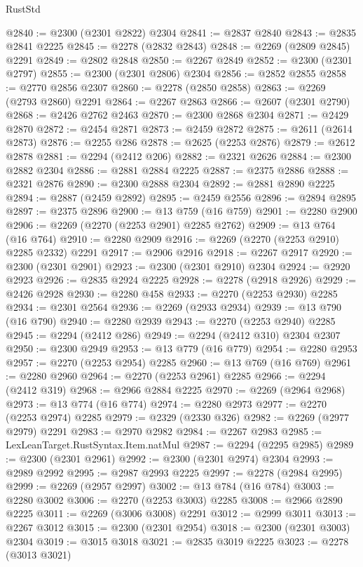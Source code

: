 \begin{lexlean}{RustStd}
\begin{coremodule}
@2840 := @2300 (@2301 @2822) @2304
@2841 := @2837 @2840
@2843 := @2835 @2841 @2225
@2845 := @2278 (@2832 @2843)
@2848 := @2269 (@2809 @2845) @2291
@2849 := @2802 @2848
@2850 := @2267 @2849
@2852 := @2300 (@2301 @2797)
@2855 := @2300 (@2301 @2806) @2304
@2856 := @2852 @2855
@2858 := @2770 @2856 @2307
@2860 := @2278 (@2850 @2858)
@2863 := @2269 (@2793 @2860) @2291
@2864 := @2267 @2863
@2866 := @2607 (@2301 @2790)
@2868 := @2426 @2762 @2463
@2870 := @2300 @2868 @2304
@2871 := @2429 @2870
@2872 := @2454 @2871
@2873 := @2459 @2872
@2875 := @2611 (@2614 @2873)
@2876 := @2255 @286
@2878 := @2625 (@2253 @2876)
@2879 := @2612 @2878
@2881 := @2294 (@2412 @206)
@2882 := @2321 @2626
@2884 := @2300 @2882 @2304
@2886 := @2881 @2884 @2225
@2887 := @2375 @2886
@2888 := @2321 @2876
@2890 := @2300 @2888 @2304
@2892 := @2881 @2890 @2225
@2894 := @2887 (@2459 @2892)
@2895 := @2459 @2556
@2896 := @2894 @2895
@2897 := @2375 @2896
@2900 := @13 @759 (@16 @759)
@2901 := @2280 @2900
@2906 := @2269 (@2270 (@2253 @2901) @2285 @2762)
@2909 := @13 @764 (@16 @764)
@2910 := @2280 @2909
@2916 := @2269 (@2270 (@2253 @2910) @2285 @2332) @2291
@2917 := @2906 @2916
@2918 := @2267 @2917
@2920 := @2300 (@2301 @2901)
@2923 := @2300 (@2301 @2910) @2304
@2924 := @2920 @2923
@2926 := @2835 @2924 @2225
@2928 := @2278 (@2918 @2926)
@2929 := @2426 @2928
@2930 := @2280 @458
@2933 := @2270 (@2253 @2930) @2285
@2934 := @2301 @2564
@2936 := @2269 (@2933 @2934)
@2939 := @13 @790 (@16 @790)
@2940 := @2280 @2939
@2943 := @2270 (@2253 @2940) @2285
@2945 := @2294 (@2412 @286)
@2949 := @2294 (@2412 @310) @2304 @2307
@2950 := @2300 @2949
@2953 := @13 @779 (@16 @779)
@2954 := @2280 @2953
@2957 := @2270 (@2253 @2954) @2285
@2960 := @13 @769 (@16 @769)
@2961 := @2280 @2960
@2964 := @2270 (@2253 @2961) @2285
@2966 := @2294 (@2412 @319)
@2968 := @2966 @2884 @2225
@2970 := @2269 (@2964 @2968)
@2973 := @13 @774 (@16 @774)
@2974 := @2280 @2973
@2977 := @2270 (@2253 @2974) @2285
@2979 := @2329 (@2330 @326)
@2982 := @2269 (@2977 @2979) @2291
@2983 := @2970 @2982
@2984 := @2267 @2983
@2985 := LexLeanTarget.RustSyntax.Item.natMul
@2987 := @2294 (@2295 @2985)
@2989 := @2300 (@2301 @2961)
@2992 := @2300 (@2301 @2974) @2304
@2993 := @2989 @2992
@2995 := @2987 @2993 @2225
@2997 := @2278 (@2984 @2995)
@2999 := @2269 (@2957 @2997)
@3002 := @13 @784 (@16 @784)
@3003 := @2280 @3002
@3006 := @2270 (@2253 @3003) @2285
@3008 := @2966 @2890 @2225
@3011 := @2269 (@3006 @3008) @2291
@3012 := @2999 @3011
@3013 := @2267 @3012
@3015 := @2300 (@2301 @2954)
@3018 := @2300 (@2301 @3003) @2304
@3019 := @3015 @3018
@3021 := @2835 @3019 @2225
@3023 := @2278 (@3013 @3021)

\end{coremodule}
\end{lexlean}

